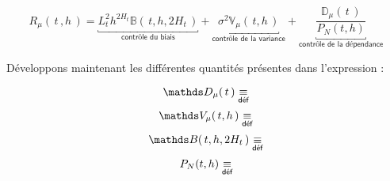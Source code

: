 \bigskip

\begin{equation*}
	R_\mu( \, t \, , h \, ) =
	\underbracket{L_t^2 h ^{2H_t} \mathds B( \, t, h, 2H_t \,) }_{\textsf{contrôle du biais}}
	+ \underbracket{\sigma^2 \mathds V_\mu( \, t, h \, ) }_{\textsf{contrôle de la variance}}
	+ \underbracket{\frac{\mathds D_\mu( \, t \, )}{P_N(t, h)}}_{\textsf{contrôle de la dépendance}}
\end{equation*}

Développons maintenant les différentes quantités présentes dans l'expression :

\begin{equation*}
	{\mathds D_\mu( \, t \, )} \isdef
\end{equation*}
\begin{equation*}
	\mathds V_\mu( \, t, h \, ) \isdef
\end{equation*}
\begin{equation*}
	\mathds B( \, t, h, 2H_t \,) \isdef
\end{equation*}
\begin{equation*}
	P_N(t, h) \isdef
\end{equation*}

